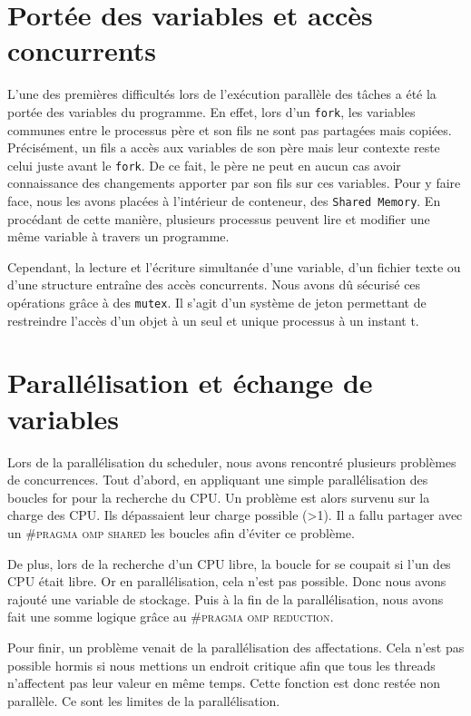 \section{Portée des variables et accès concurrents}

    L'une des premières difficultés lors de l'exécution parallèle des tâches a été la portée des variables du programme. En effet, lors d'un \texttt{fork}, les variables communes entre le processus père et son fils ne sont pas partagées mais copiées. Précisément, un fils a accès aux variables de son père mais leur contexte reste celui juste avant le \texttt{fork}. De ce fait, le père ne peut en aucun cas avoir connaissance des changements apporter par son fils sur ces variables. Pour y faire face, nous les avons placées à l'intérieur de conteneur, des \texttt{Shared Memory}. En procédant de cette manière, plusieurs processus peuvent lire et modifier une même variable à travers un programme. \newline
    
    Cependant, la lecture et l'écriture simultanée d'une variable, d'un fichier texte ou d'une structure entraîne des accès concurrents. Nous avons dû sécurisé ces opérations grâce à des \texttt{mutex}. Il s'agit d'un système de jeton permettant de restreindre l'accès d'un objet à un seul et unique processus à un instant t.

    

\section{Parallélisation et échange de variables}
    
    Lors de la parallélisation du scheduler, nous avons rencontré plusieurs problèmes de concurrences. Tout d'abord, en appliquant une simple parallélisation des boucles for pour la recherche du CPU. Un problème est alors survenu sur la charge des CPU. Ils dépassaient leur charge possible (>1). Il a fallu partager avec un \textsc{\#pragma omp shared} les boucles afin d'éviter ce problème.
    
    De plus, lors de la recherche d'un CPU libre, la boucle for se coupait si l'un des CPU était libre. Or en parallélisation, cela n'est pas possible. Donc nous avons rajouté une variable de stockage. Puis à la fin de la parallélisation, nous avons fait une somme logique grâce au \textsc{\#pragma omp reduction}. 
    
    Pour finir, un problème venait de la parallélisation des affectations. Cela n'est pas possible hormis si nous mettions un endroit critique afin que tous les threads n'affectent pas leur valeur en même temps. Cette fonction est donc restée non parallèle. Ce sont les limites de la parallélisation. 
    
